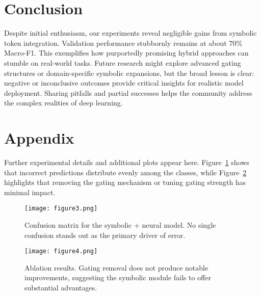 \documentclass[12pt]{article}
\begin{document}
\section{Conclusion}
Despite initial enthusiasm, our experiments reveal negligible gains from symbolic token integration. Validation performance stubbornly remains at about 70\% Macro-F1. This exemplifies how purportedly promising hybrid approaches can stumble on real-world tasks. Future research might explore advanced gating structures or domain-specific symbolic expansions, but the broad lesson is clear: negative or inconclusive outcomes provide critical insights for realistic model deployment. Sharing pitfalls and partial successes helps the community address the complex realities of deep learning.




\clearpage
\appendix

\section{Appendix}
Further experimental details and additional plots appear here. Figure~\ref{fig:confusion_matrix} shows that incorrect predictions distribute evenly among the classes, while Figure~\ref{fig:ablation} highlights that removing the gating mechanism or tuning gating strength has minimal impact.

\begin{figure}[h]
\centering
\texttt{[image: figure3.png]}
\caption{Confusion matrix for the symbolic + neural model. No single confusion stands out as the primary driver of error.}
\label{fig:confusion_matrix}
\end{figure}

\begin{figure}[h]
\centering
\texttt{[image: figure4.png]}
\caption{Ablation results. Gating removal does not produce notable improvements, suggesting the symbolic module fails to offer substantial advantages.}
\label{fig:ablation}
\end{figure}
\end{document}
